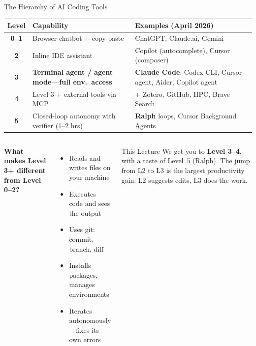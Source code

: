 \documentclass[aspectratio=169,10pt]{beamer}
\newcommand{\emphc}[1]{\textcolor{harvardcrimson}{#1}}
\begin{document}
\begin{frame}{The Hierarchy of AI Coding Tools}
\scriptsize

\begin{center}
\renewcommand{\arraystretch}{1.1}
\begin{tabular}{c p{6.0cm} p{4.7cm}}
\toprule
\textbf{Level} & \textbf{Capability} & \textbf{Examples (April 2026)} \\
\midrule
\textbf{0--1} & Browser chatbot + copy-paste & ChatGPT, Claude.ai, Gemini \\
\textbf{2} & Inline IDE assistant & Copilot (autocomplete), Cursor (composer) \\
\rowcolor{softblue!10}
\textbf{3} & \textbf{Terminal agent / agent mode---full env.\ access} & \textbf{Claude Code}, Codex CLI, Cursor agent, Aider, Copilot agent \\
\rowcolor{softblue!10}
\textbf{4} & Level 3 + external tools via MCP & + Zotero, GitHub, HPC, Brave Search \\
\textbf{5} & Closed-loop autonomy with verifier (1--2 hrs) & \textbf{Ralph} loops, Cursor Background Agents \\
\bottomrule
\end{tabular}
\end{center}

\vspace{0.3em}
\begin{columns}[T]
\textbf{What makes Level 3+ different from Level 0--2?}
\begin{itemize}\itemsep0pt
    \item Reads and writes files on your machine
    \item Executes code and sees the output
    \item Uses git: commit, branch, diff
    \item Installs packages, manages environments
    \item Iterates autonomously---fixes its own errors
\end{itemize}

\begin{alertblock}{This Lecture}
\scriptsize
We get you to \textbf{Level 3--4}, with a taste of Level~5 (Ralph). The jump
from L2 to L3 is the largest productivity gain: L2 suggests edits, L3
\emphc{does the work}.
\end{alertblock}
\end{columns}
\end{frame}
\end{document}
